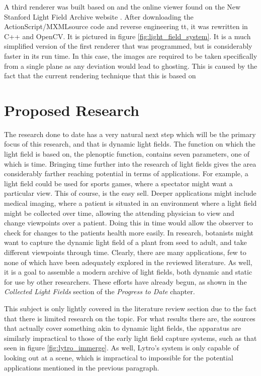 \documentclass[12pt]{report}
\begin{document}
A third renderer was built based on \cite{Levoy96} and the online viewer found on the New Stanford Light Field Archive website \cite{lfArchive}. After downloading the ActionScript/MXMLsource code and reverse engineering tt, it was rewritten in C++ and OpenCV. It is pictured in figure \ref{fig:light_field_system}. It is a much simplified version of the first renderer that was programmed, but is considerably faster in its run time. In this case, the images are required to be taken specifically from a single plane as any deviation would lead to ghosting. This is caused by the fact that the current rendering technique that this is based on 

\chapter{Proposed Research}
The research done to date has a very natural next step which will be the primary focus of this research, and that is dynamic light fields. The function on which the light field is based on, the plenoptic function, contains seven parameters, one of which is time. Bringing time further into the research of light fields gives the area considerably farther reaching potential in terms of applications. For example, a light field could be used for sports games, where a spectator might want a particular view. This of course, is the easy sell. Deeper applications might include medical imaging, where a patient is situated in an environment where a light field might be collected over time, allowing the attending physician to view and change viewpoints over a patient. Doing this in time would allow the observer to check for changes to the patients health more easily. In research, botanists might want to capture the dynamic light field of a plant from seed to adult, and take different viewpoints through time. Clearly, there are many applications, few to none of which have been adequately explored in the reviewed literature. As well, it is a goal to assemble a modern archive of light fields, both dynamic and static for use by other researchers. These efforts have already begun, as shown in the \emph{Collected Light Fields} section of the \emph{Progress to Date} chapter.

This subject is only lightly covered in the literature review section due to the fact that there is limited research on the topic. For what results there are, the sources that actually cover something akin to dynamic light fields, the apparatus are similarly impractical to those of the early light field capture systems, such as that seen in figure \ref{fig:lytro_immerge}. As well, Lytro's system is only capable of looking out at a scene, which is impractical to impossible for the potential applications mentioned in the previous paragraph. 
\end{document}
